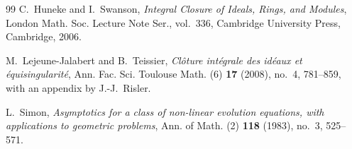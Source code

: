 \documentclass[11pt]{article}
\theoremstyle{definition}
\theoremstyle{remark}
\begin{document}
\begin{thebibliography}{99}
C.~Huneke and I.~Swanson,
\emph{Integral Closure of Ideals, Rings, and Modules},
London Math. Soc. Lecture Note Ser., vol.~336, Cambridge University Press, Cambridge, 2006.

M.~Lejeune-Jalabert and B.~Teissier,
\emph{Cl\^oture int\'egrale des id\'eaux et \'equisingularit\'e},
Ann. Fac. Sci. Toulouse Math. (6) \textbf{17} (2008), no.~4, 781--859,
with an appendix by J.-J.~Risler.

L.~Simon,
\emph{Asymptotics for a class of non-linear evolution equations, with applications to geometric problems},
Ann. of Math. (2) \textbf{118} (1983), no.~3, 525--571.

\end{thebibliography}
\end{document}
